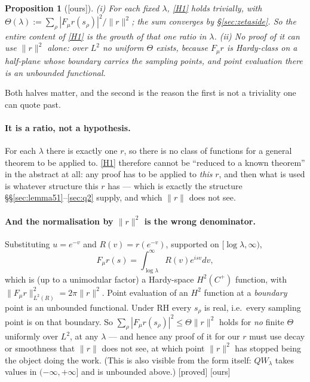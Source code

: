 \documentclass[11pt,a4paper]{article}
\theoremstyle{plain}
\newtheorem{proposition}[theorem]{Proposition}
\theoremstyle{definition}
\theoremstyle{remark}
\newcommand{\st}[1]{{\normalfont\sffamily\footnotesize[#1]}}
\newcommand{\proved}{\st{proved}}
\newcommand{\ours}{{\normalfont\sffamily\footnotesize[ours]}}
\newcommand{\R}{\mathbb{R}}
\newcommand{\Z}{\mathbb{Z}}
\newcommand{\Q}{\mathbb{Q}}
\newcommand{\A}{\mathbb{A}}
\newcommand{\C}{\mathbb{C}}
\newcommand{\E}{\mathcal{E}}
\newcommand{\F}{\mathcal{F}}
\newcommand{\PS}{\mathit{PS}}
\newcommand{\Sonin}{\mathbf{S}}
\newcommand{\QW}{QW}
\newcommand{\file}[1]{\path{#1}}
\def\QW{QW}\def\E{E}\def\F{F}\def\R{R}\def\Q{Q}\def\Z{Z}\def\A{A}%
\def\C{C}\def\PS{PS}\def\Sonin{S}\def\file#1{#1}%
\begin{document}
\begin{proposition}[\ours]\label{prop:noH1}
\emph{(i)} For each fixed $\lambda$, \eqref{H1} holds trivially, with
$\Theta(\lambda):=\sum_\rho|\F_\mu r(s_\rho)|^2/\|r\|^2$; the sum converges by
\S\ref{sec:zetaside}.  So the entire content of \eqref{H1} is the growth of that
one ratio in $\lambda$.  \emph{(ii)} No proof of it can use $\|r\|^2$ alone:
over $L^2$ no uniform $\Theta$ exists, because $\F_\mu r$ is Hardy-class on a
half-plane whose boundary carries the sampling points, and point evaluation
there is an unbounded functional.
\end{proposition}

Both halves matter, and the second is the reason the first is not a triviality
one can quote past.

\paragraph{It is a ratio, not a hypothesis.}  For each $\lambda$ there is exactly
one $r$, so there is no class of functions for a general theorem to be applied
to.  \eqref{H1} therefore cannot be ``reduced to a known theorem'' in the
abstract at all: any proof has to be applied to \emph{this} $r$, and then what
is used is whatever structure this $r$ has --- which is exactly the structure
\S\S\ref{sec:lemma51}--\ref{sec:q2} supply, and which $\|r\|$ does not see.

\paragraph{And the normalisation by $\|r\|^2$ is the wrong denominator.}
Substituting
$u=e^{-v}$ and $R(v)=r(e^{-v})$, supported on $[\log\lambda,\infty)$,
\[
  \F_\mu r(s)=\int_{\log\lambda}^\infty R(v)e^{isv}dv ,
\]
which is (up to a unimodular factor) a Hardy-space $H^2(\C^+)$ function, with
$\|\F_\mu r\|^2_{L^2(\R)}=2\pi\|r\|^2$.  Point evaluation of an $H^2$ function
at a \emph{boundary} point is an unbounded functional.  Under RH every $s_\rho$
is real, i.e.\ every sampling point is on that boundary.  So
$\sum_\rho|\F_\mu r(s_\rho)|^2\le\Theta\|r\|^2$ holds for \emph{no} finite
$\Theta$ uniformly over $L^2$, at any $\lambda$ --- and hence any proof of it
for our $r$ must use decay or smoothness that $\|r\|$ does not see, at which
point $\|r\|^2$ has stopped being the object doing the work.  (This is also
visible from the form itself: $\QW_\lambda$ takes values in $(-\infty,+\infty]$
and is unbounded above.)  \proved{} \ours
\end{document}
